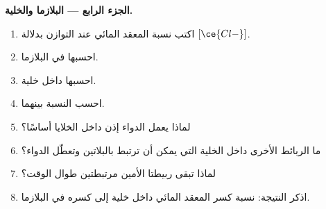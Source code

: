 \begin{problem}
\medskip\noindent\textbf{الجزء الرابع --- البلازما والخلية.}
\begin{enumerate}[resume]
  \item اكتب نسبة المعقد المائي عند التوازن بدلالة
        $[\ce{Cl-}]$.
  \item احسبها في البلازما.
  \item احسبها داخل خلية.
  \item احسب النسبة بينهما.
  \item لماذا يعمل الدواء إذن داخل الخلايا أساسًا؟
  \item ما الربائط الأخرى داخل الخلية التي يمكن أن ترتبط بالبلاتين وتعطّل
        الدواء؟
  \item لماذا تبقى ربيطتا الأمين مرتبطتين طوال الوقت؟
  \item اذكر النتيجة: نسبة كسر المعقد المائي داخل خلية إلى
        كسره في البلازما.
\end{enumerate}
\end{problem}
